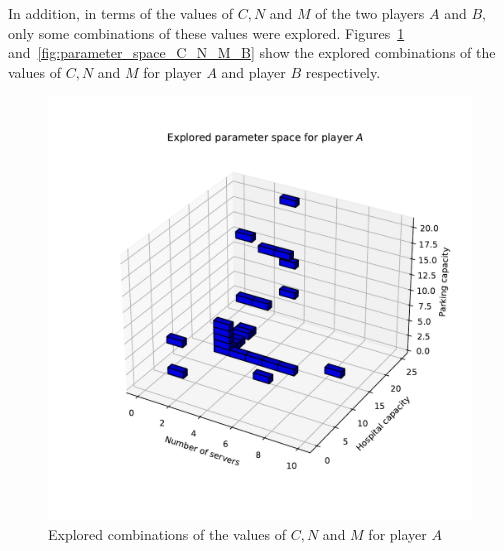In addition, in terms of the values of \(C, N\) and \(M\) of the two players
\(A\) and \(B\), only some combinations of these values were explored.
Figures~\ref{fig:parameter_space_C_N_M_A} and~\ref{fig:parameter_space_C_N_M_B}
show the explored combinations of the values of \(C, N\) and \(M\) for player
\(A\) and player \(B\) respectively.

\begin{figure}[H]
    \centering
    \includegraphics[width=\linewidth]{chapters/05_numerical_results/Bin/explored_parameters_1.pdf}
    \caption{Explored combinations of the values of \(C, N\) and \(M\) for
    player \(A\)}
    \label{fig:parameter_space_C_N_M_A}
\end{figure}

